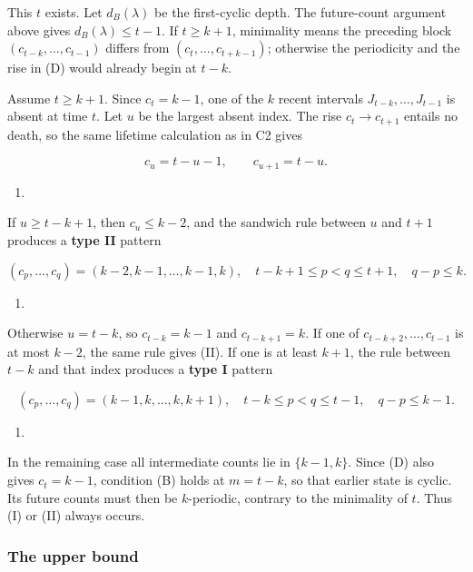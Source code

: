 \documentclass[11pt,a4paper]{article}
\providecommand{\tightlist}{\setlength{\itemsep}{0pt}\setlength{\parskip}{0pt}}
\begin{document}
This \(t\) exists. Let \(d_B(\lambda)\) be the first-cyclic depth. The future-count argument above gives \(d_B(\lambda)\le t-1\). If \(t\ge k+1\), minimality means the preceding block \((c_{t-k},\ldots,c_{t-1})\) differs from \((c_t,\ldots,c_{t+k-1})\); otherwise the periodicity and the rise in (D) would already begin at \(t-k\).

Assume \(t\ge k+1\). Since \(c_t=k-1\), one of the \(k\) recent intervals \(J_{t-k},\ldots,J_{t-1}\) is absent at time \(t\). Let \(u\) be the largest absent index. The rise \(c_t\to c_{t+1}\) entails no death, so the same lifetime calculation as in C2 gives

\[
c_u=t-u-1,\qquad c_{u+1}=t-u.
\]

\begin{enumerate}
\def\labelenumi{(\Alph{enumi})}
\setcounter{enumi}{4}
\tightlist
\item
\end{enumerate}

If \(u\ge t-k+1\), then \(c_u\le k-2\), and the sandwich rule between \(u\) and \(t+1\) produces a \textbf{type II} pattern

\[
(c_p,\ldots,c_q)=(k-2,k-1,\ldots,k-1,k),\quad
t-k+1\le p<q\le t+1,\quad q-p\le k.
\]

\begin{enumerate}
\def\labelenumi{(\Roman{enumi})}
\setcounter{enumi}{1}
\tightlist
\item
\end{enumerate}

Otherwise \(u=t-k\), so \(c_{t-k}=k-1\) and \(c_{t-k+1}=k\). If one of \(c_{t-k+2},\ldots,c_{t-1}\) is at most \(k-2\), the same rule gives (II). If one is at least \(k+1\), the rule between \(t-k\) and that index produces a \textbf{type I} pattern

\[
(c_p,\ldots,c_q)=(k-1,k,\ldots,k,k+1),\quad
t-k\le p<q\le t-1,\quad q-p\le k-1.
\]

\begin{enumerate}
\def\labelenumi{(\Roman{enumi})}
\tightlist
\item
\end{enumerate}

In the remaining case all intermediate counts lie in \(\{k-1,k\}\). Since (D) also gives \(c_t=k-1\), condition (B) holds at \(m=t-k\), so that earlier state is cyclic. Its future counts must then be \(k\)-periodic, contrary to the minimality of \(t\). Thus (I) or (II) always occurs.

\subsubsection{The upper bound}\label{the-upper-bound}
\end{document}
